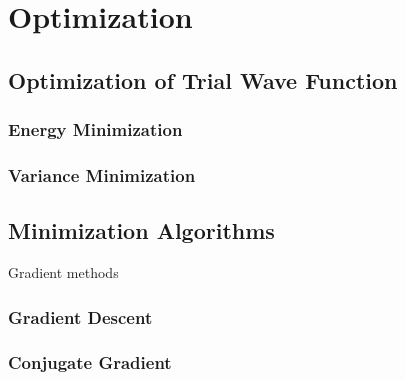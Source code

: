 \chapter{Optimization}

\section{Optimization of Trial Wave Function}
\subsection{Energy Minimization}
\subsection{Variance Minimization}

\section{Minimization Algorithms}
Gradient methods
\subsection{Gradient Descent}
\subsection{Conjugate Gradient}